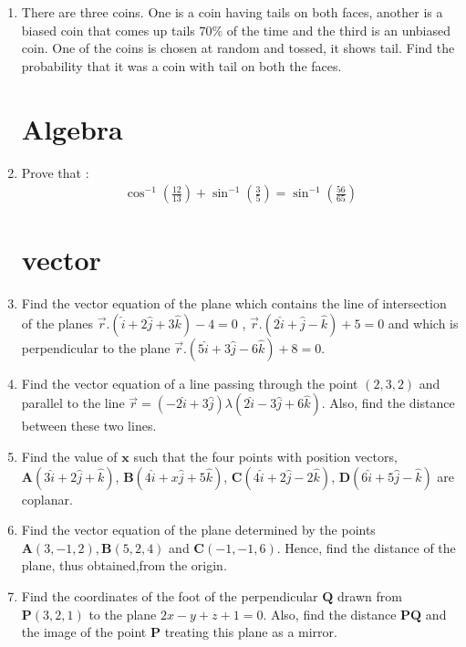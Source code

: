 \documentclass[10pt,-letter paper]{article}
\let\vec\mathbf{}
\let\vec\mathbf{}
\let\vec\mathbf{}
\providecommand{\brak}[1]{\ensuremath{\left(#1\right)}}
\begin{document}
\begin{enumerate}
\item There are three coins. One is a coin having tails on both faces, another is a biased coin that comes up tails $70\%$ of the time and the third is an unbiased coin. One of the coins is chosen at random and tossed, it shows tail. Find the probability that it was a coin with tail on both the faces.

\section{Algebra}
\item Prove that :
\begin{align*}
\cos^{-1}\brak{\frac{12}{13}}+\sin^{-1}\brak{\frac{3}{5}}=\sin^{-1} \brak{\frac{56}{65}}
\end{align*}

\section{vector}
\item Find the vector equation of the plane which contains the line of intersection of the planes 
$ \overrightarrow{r}.\brak{\hat{i} + 2\hat{j}+3\hat{k}}-4=0$ , $\overrightarrow{r}.
\brak{2\hat{i} + \hat{j} - \hat{k}}+5=0$ and which is perpendicular to the plane $\overrightarrow{r}.\brak{5\hat{i} + 3\hat{j} - 6\hat{k}}+8=0$.

\item Find the vector equation of a line passing through the point
$\brak{2, 3, 2}$ and parallel to the line $\overrightarrow{r}=\brak{-2\hat{i} +3\hat{j}}\lambda\brak{2\hat{i} - 3\hat{j}+6\hat{k}}$.
Also, find the distance between these two lines.

\item Find the value of $\vec{x}$ such that the four points with position vectors,
$\vec{A}\brak{3\hat{i} + 2\hat{j} + \hat{k}}$, $\vec{B}\brak{4\hat{i} + x\hat{j} + 5\hat{k}}$, $\vec{C}\brak{4\hat{i} + 2\hat{j} -2 \hat{k}}$, $\vec{D}\brak{6\hat{i} + 5\hat{j} - \hat{k}}$ are coplanar.

\item Find the vector equation of the plane determined by the points $\vec{A}\brak{3, -1, 2}, \vec{B}\brak{5, 2, 4}$ and $\vec{C}\brak{-1, -1, 6}$. Hence, find the distance of the plane, thus obtained,from the origin.

\item Find the coordinates of the foot of the perpendicular $\vec{Q}$ drawn from $\vec{P}\brak{3, 2, 1}$ to the plane $2x - y + z + 1 = 0$. Also, find the distance $\vec{P}\vec{Q}$ and the image of the point $\vec{P}$ treating this plane as a mirror.


\end{enumerate}
\end{document}
